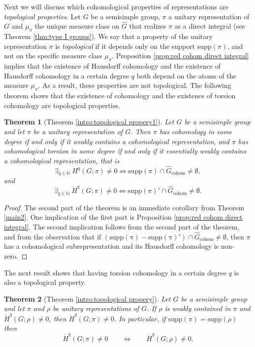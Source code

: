 \documentclass[12pt,reqno]{amsart}
\newcommand{\N}{\mathbb{N}}
\newtheorem{theorem}{Theorem}[section]
\theoremstyle{definition}
\newcommand{\torH}{\mathring{H}}
\begin{document}
Next we will discuss which cohomological properties of representations are \emph{topological properties}. Let $G$ be a semisimple group, $\pi$ a unitary representation of $G$ and $\mu_\pi$ the unique measure class on $\widehat{G}$ that realizes $\pi$ as a direct integral (see Theorem \ref{thm:type I groups}). We say that a property of the unitary representation $\pi$ is \emph{topological} if it depends only on the support $\mathrm{supp}(\pi)$, and not on the specific measure class $\mu_\pi$. Proposition \ref{prop:red cohom direct integral} implies that the existence of Hausdorff cohomology and the existence of Hausdorff cohomology in a certain degree $q$ both depend on the atoms of the measure $\mu_\pi$. As a result, these properties are not topological. The following theorem shows that the existence of cohomology and the existence of torsion cohomology are topological properties.
\begin{theorem}[Theorem \ref{intro:topological propery1}]\label{thm:topological property1}
    Let $G$ be a semisimple group and let $\pi$ be a unitary representation of $G$.
    Then $\pi$ has cohomology in some degree if and only if it weakly contains a cohomological representation, and $\pi$ has cohomological torsion in some degree if and only if it essentially weakly contains a cohomological representation, that is 
    \[ \exists_{q\in\N}~H^q(G;\pi)\neq 0 \iff \mathrm{supp}(\pi) \cap \widehat{G}_{\mathrm{cohom}} \neq \emptyset,  \]
    and 
    \[ \exists_{q\in\N}~\torH^q(G;\pi)\neq 0 \iff \mathrm{supp}(\pi)' \cap \widehat{G}_{\mathrm{cohom}} \neq \emptyset.  \]
\end{theorem}
\begin{proof}
    The second part of the theorem is an immediate corollary from Theorem \ref{main2}. One implication of the first part is Proposition \ref{prop:red cohom direct integral}. The second implication follows from the second part of the theorem, and from the observation that if $(\mathrm{supp(\pi)}-\mathrm{supp(\pi)'}) \cap \widehat{G}_\mathrm{cohom} \ne \emptyset$, then $\pi$ has a cohomological subrepresentation and its Hausdorff cohomology is non-zero. 
\end{proof}
The next result shows that having torsion cohomology in a certain degree $q$ is also a topological property.
\begin{theorem}[Theorem \ref{intro:topological propery}]\label{thm:non-Hausdorff is topological}
    Let $G$ be a semisimple group and let $\pi$ and $\rho$ be unitary representations of $G$.
    If $\rho$ is weakly contained in $\pi$ and $\torH^q(G;\rho) \ne 0$, then $\torH^q(G;\pi) \ne 0$. In particular, if $\mathrm{supp}(\pi)=\mathrm{supp}(\rho)$ then 
    \[ \torH^q(G;\pi)\neq 0 \qquad \Longleftrightarrow \qquad \torH^q(G;\rho) \neq 0. \]
\end{theorem}
\end{document}
